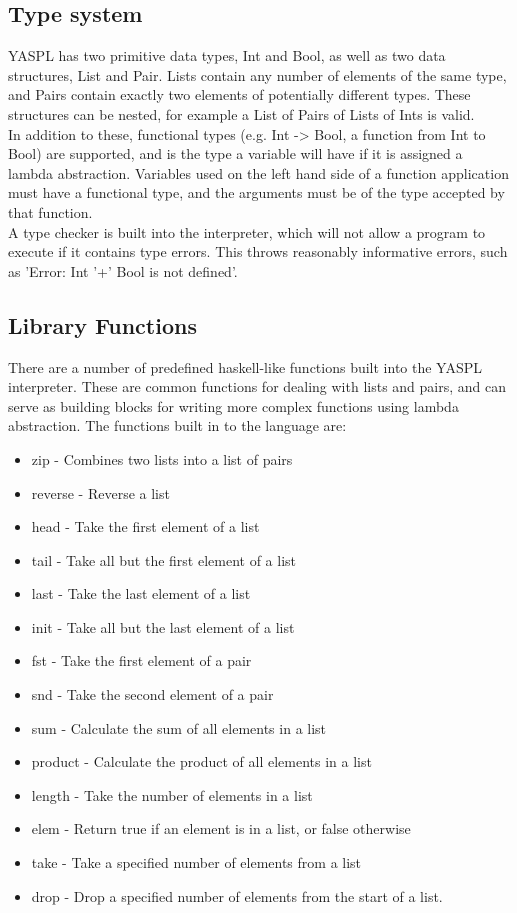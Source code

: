 \documentclass{article}
\begin{document}
\subsection{Type system}
YASPL has two primitive data types, Int and Bool, as well as two data structures, List and Pair. Lists contain any number of elements of the same type, and Pairs contain exactly two elements of potentially different types. These structures can be nested, for example a List of Pairs of Lists of Ints is valid.
\\
In addition to these, functional types (e.g. Int -> Bool, a function from Int to Bool) are supported, and is the type a variable will have if it is assigned a lambda abstraction. Variables used on the left hand side of a function application must have a functional type, and the arguments must be of the type accepted by that function.
\\
A type checker is built into the interpreter, which will not allow a program to execute if it contains type errors. This throws reasonably informative errors, such as 'Error: Int '+' Bool is not defined'. 
\subsection{Library Functions}
There are a number of predefined haskell-like functions built into the YASPL interpreter. These are common functions for dealing with lists and pairs, and can serve as building blocks for writing more complex functions using lambda abstraction. The functions built in to the language are:
\begin{itemize}
    \item zip - Combines two lists into a list of pairs
    \item reverse - Reverse a list
    \item head - Take the first element of a list
    \item tail - Take all but the first element of a list
    \item last - Take the last element of a list
    \item init - Take all but the last element of a list
    \item fst - Take the first element of a pair
    \item snd - Take the second element of a pair
    \item sum - Calculate the sum of all elements in a list
    \item product - Calculate the product of all elements in a list
    \item length - Take the number of elements in a list
    \item elem - Return true if an element is in a list, or false otherwise
    \item take - Take a specified number of elements from a list
    \item drop - Drop a specified number of elements from the start of a list.
\end{itemize}
\end{document}
